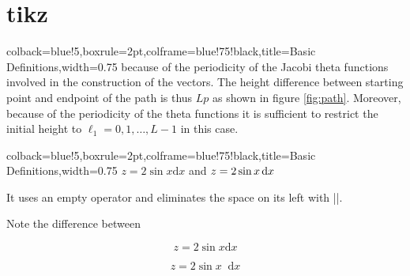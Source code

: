 {\bigskip


\clearpage
\section{tikz}
\begin{tcblisting}{colback=blue!5,boxrule=2pt,colframe=blue!75!black,title=Basic Definitions,width=0.75\textwidth}
because of the periodicity of the Jacobi theta functions involved in the construction of the vectors.
The height difference between starting point and endpoint of the path is thus $Lp$ as shown in figure \ref{fig:path}. Moreover, because of the periodicity of the theta functions it is sufficient to restrict the initial height to $\ell_1=0,1,\dots,L-1$ in this case.
  \centering
\end{tcblisting}
\clearpage


\begin{tcblisting}{colback=blue!5,boxrule=2pt,colframe=blue!75!black,title=Basic Definitions,width=0.75\textwidth}
\newcommand{\ud}{\ensuremath \mathop{}\!\mathrm{d}}
\(z=2\sin x\mathrm{d}x\) and \(z=2\sin x\ud x\)
\end{tcblisting}
\newcommand{\ud}{\mathop{}\!\mathrm{d}}
\bigskip

It uses an empty operator and eliminates the space
on its left with |\!|.

Note the difference between

\[z=2\sin x\mathrm{d}x  \]

\[z=2\sin x\ud x\]

}
